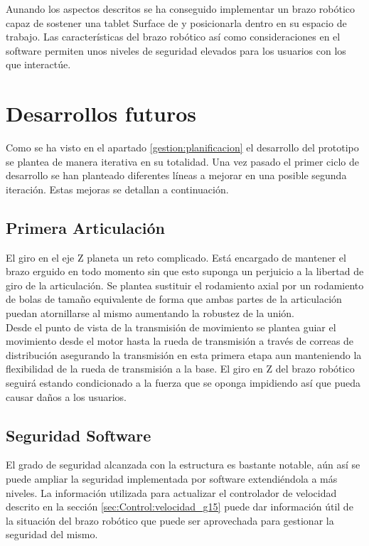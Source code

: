 Aunando los aspectos descritos se ha conseguido implementar un brazo robótico capaz de sostener una tablet Surface de \cite{microsoftSurface} y posicionarla dentro en su espacio de trabajo. Las características del brazo robótico así como consideraciones en el software permiten unos niveles de seguridad elevados para los usuarios con los que interactúe.

\section{Desarrollos futuros} \label{sec:Conclusiones:Desarrollos_futuros}

Como se ha visto en el apartado \ref{gestion:planificacion} el desarrollo del prototipo se plantea de manera iterativa en su totalidad. Una vez pasado el primer ciclo de desarrollo se han planteado diferentes líneas a mejorar en una posible segunda iteración. Estas mejoras se detallan a continuación.
\subsection{Primera Articulación}

El giro en el eje Z planeta un reto complicado. Está encargado de mantener el brazo erguido en todo momento sin que esto suponga un perjuicio a la libertad de giro de la articulación. Se plantea sustituir el rodamiento axial por un rodamiento de bolas de tamaño equivalente de forma que ambas partes de la articulación puedan atornillarse al mismo aumentando la robustez de la unión. 
\\

Desde el punto de vista de la transmisión de movimiento se plantea guiar el movimiento desde el motor hasta la rueda de transmisión a través de correas de distribución asegurando la transmisión en esta primera etapa aun manteniendo la flexibilidad de la rueda de transmisión a la base. El giro en Z del brazo robótico seguirá estando condicionado a la fuerza que se oponga impidiendo así que pueda causar daños a los usuarios.

\subsection{Seguridad Software}

El grado de seguridad alcanzada con la estructura es bastante notable, aún así se puede ampliar la seguridad implementada por software extendiéndola a más niveles. La información utilizada para actualizar el controlador de velocidad descrito en la sección \ref{sec:Control:velocidad_g15} puede dar información útil de la situación del brazo robótico que puede ser aprovechada para gestionar la seguridad del mismo.
\\

